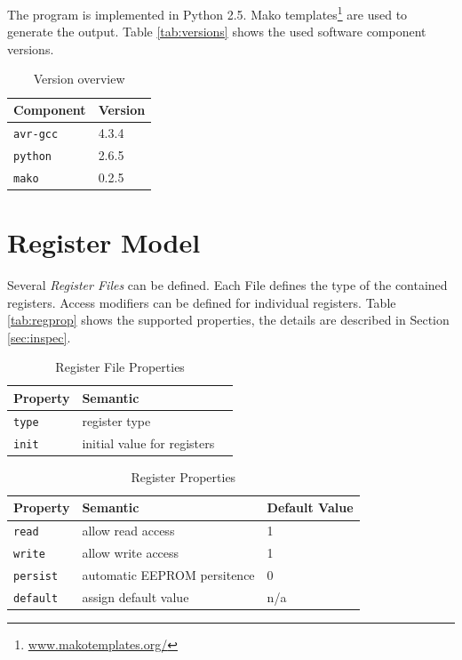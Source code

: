 \documentclass[a4paper,pdftex]{paper}
\begin{document}
The program is implemented in Python 2.5.  Mako
templates\footnote{\url{www.makotemplates.org/}} are used to generate
the output.  Table \vref{tab:versions} shows the used software
component versions.

\begin{table}
  \centering
  \begin{tabular}{ll} \toprule
    Component & Version \\ \midrule
    {\tt avr-gcc } & 4.3.4 \\
    {\tt python } & 2.6.5 \\
    {\tt mako } & 0.2.5 \\ \bottomrule
  \end{tabular}
  \caption{Version overview}
  \label{tab:versions}
\end{table}

\section{Register Model}

Several \emph{Register Files} can be defined.  Each File defines the
type of the contained registers.  Access modifiers can be defined for
individual registers.  Table \vref{tab:regprop} shows the supported
properties, the details are described in Section \vref{sec:inspec}.


\begin{table}
  \centering
  \begin{tabular}{lll} \toprule
    Property & Semantic  \\ \midrule
    {\tt type} & register type  \\
    {\tt init} & initial value for registers  \\
  \end{tabular}
  \caption{Register File Properties}
  \label{tab:regfileprop}
\end{table}


\begin{table}
  \centering
  \label{tab:regprop}
  \begin{tabular}{lll} \toprule
    Property & Semantic & Default Value \\ \midrule
    {\tt read} & allow read access & 1 \\
    {\tt write} & allow write access & 1 \\
    {\tt persist} & automatic EEPROM persitence & 0 \\
    {\tt default} & assign default value & n/a \\ \bottomrule
  \end{tabular}
  \caption{Register Properties}
\end{table}
\end{document}
